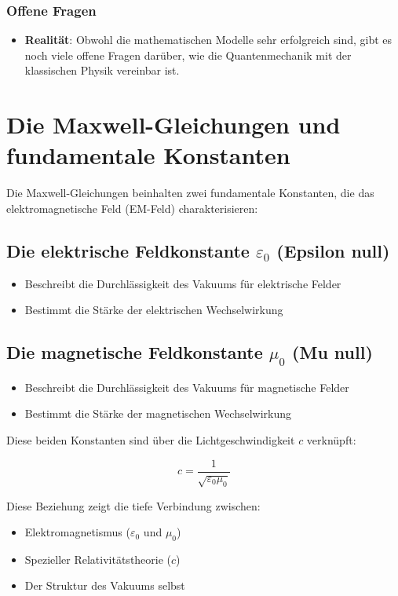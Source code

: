 \documentclass[12pt,a4paper]{article}
\begin{document}
	\subsubsection{Offene Fragen}
	\begin{itemize}
		\item \textbf{Realität}: Obwohl die mathematischen Modelle sehr erfolgreich sind, gibt es noch viele offene Fragen darüber, wie die Quantenmechanik mit der klassischen Physik vereinbar ist.
	\end{itemize}
	
	
	
	\section{Die Maxwell-Gleichungen und fundamentale Konstanten}
	
	Die Maxwell-Gleichungen beinhalten zwei fundamentale Konstanten, die das elektromagnetische Feld (EM-Feld) charakterisieren:
	
	\subsection{Die elektrische Feldkonstante \(\varepsilon_0\) (Epsilon null)}
	\begin{itemize}
		\item Beschreibt die Durchlässigkeit des Vakuums für elektrische Felder
		\item Bestimmt die Stärke der elektrischen Wechselwirkung
	\end{itemize}
	
	\subsection{Die magnetische Feldkonstante \(\mu_0\) (Mu null)}
	\begin{itemize}
		\item Beschreibt die Durchlässigkeit des Vakuums für magnetische Felder
		\item Bestimmt die Stärke der magnetischen Wechselwirkung
	\end{itemize}
	
	Diese beiden Konstanten sind über die Lichtgeschwindigkeit \(c\) verknüpft:
	
	\[
	c = \frac{1}{\sqrt{\varepsilon_0 \mu_0}}
	\]
	
	Diese Beziehung zeigt die tiefe Verbindung zwischen:
	\begin{itemize}
		\item Elektromagnetismus (\(\varepsilon_0\) und \(\mu_0\))
		\item Spezieller Relativitätstheorie (\(c\))
		\item Der Struktur des Vakuums selbst
	\end{itemize}
	
\end{document}
